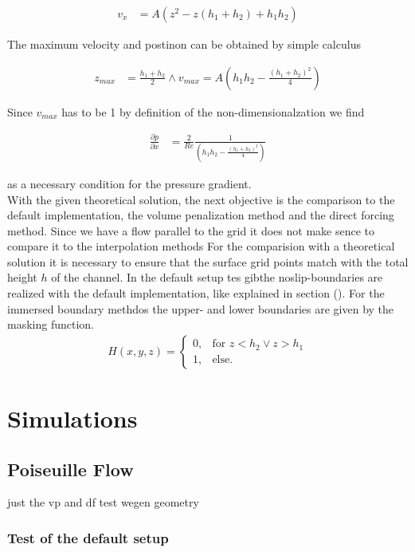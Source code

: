 \begin{align}
v_x &= A(z^2 - z(h_1 + h_2) + h_1h_2)
\end{align}

The maximum velocity and postinon can be obtained by simple calculus

\begin{align}
z_{max} &= \frac{h_1+h_2}{2} \wedge v_{max} = A\left(h_1h_2 - \frac{(h_1 + h_2)^2}{4}\right)
\end{align}

Since $v_{max}$ has to be 1 by definition of the non-dimensionalzation we find

\begin{align}
\frac{\partial p}{\partial x} &= \frac{2}{Re}\frac{1}{\left(h_1h_2 - \frac{(h_1+h_2)^2}{4} \right)}
\end{align}

as a necessary condition for the pressure gradient.\\
With the given theoretical solution, the next objective is the comparison
to the default implementation, the volume penalization method and the direct forcing method.
Since we have a flow parallel to the grid  it does not make sence to compare it to the interpolation methods
For the comparision with a theoretical solution it is necessary to ensure that
 the surface grid points match with the total height $h$ of the channel.
In the default setup tes gibthe noslip-boundaries are
realized with the default implementation, like explained in section ().
For the immersed boundary methdos the upper- and lower boundaries are given by the masking function.
\begin{align}
H(x, y, z) = \begin{cases}
                    0, & \text{for \  }  z < h_2 \lor z>h_1 \\
                    1, & \text{else}.
             \end{cases}
\end{align}

\clearpage


\section{Simulations}
\subsection{Poiseuille Flow}
just the vp and df test wegen geometry
\subsubsection{Test of the default setup}

